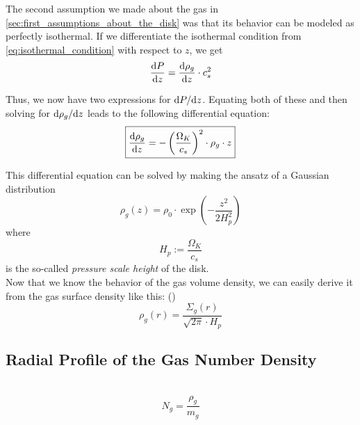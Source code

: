         The second assumption we made about the gas in \cref{sec:first_assumptions_about_the_disk}
        was that its behavior can be modeled as perfectly isothermal. If we differentiate the 
        isothermal condition from 
        \cref{eq:isothermal_condition} with respect to $z$, we get
        \begin{equation}
            \frac{\text{d} P}{\text{d} z} = \frac{\text{d} \rho_g}{\text{d} z}\cdot c_s^2
        \end{equation}

        Thus, we now have two expressions for $\text dP/\text dz$. Equating both of these and then 
        solving for $\text d\rho_g/\text dz$ leads to the following differential equation:
        \begin{equation}
            \boxed{\frac{\text{d} \rho_g}{\text{d} z} = - \left(\frac{\Omega_K}{c_s}\right)^2 \cdot \rho_g \cdot z}
        \end{equation}

        This differential equation can be solved by making the ansatz of a Gaussian distribution
        \begin{equation}
            \boxed{\rho_g(z) = \rho_0\cdot\exp\left(-\frac{z^2}{2H_p^2}\right)}
        \end{equation}
        where
        \begin{equation}
            H_p :=\frac{\Omega_K}{c_s}
        \end{equation}
        is the so-called \textit{pressure scale height} of the disk. \\

        Now that we know the behavior of the gas volume density, we can easily derive it from 
        the gas surface density like this: ()
        \begin{equation}
            \boxed{\rho_g(r) =\frac{\Sigma_g(r)}{\sqrt{2\pi}\cdot H_p}}
        \end{equation}

    \subsection{Radial Profile of the Gas Number Density}

         \\

        \begin{equation}
            N_g
                =\frac{\rho_g}{m_g}
        \end{equation}

